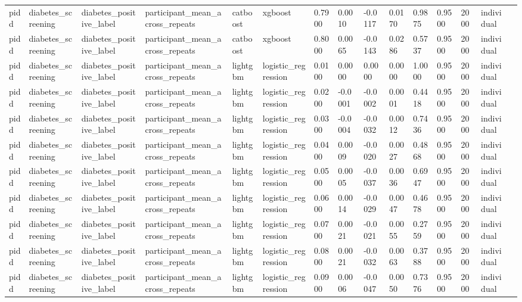 \begin{tabular}{lllllllllllllll}
pidd & diabetes\_screening & diabetes\_positive\_label & participant\_mean\_across\_repeats & catboost & xgboost & 0.7900 & 0.0010 & -0.0117 & 0.0170 & 0.9875 & 0.9500 & 2000 & individual &  \\
pidd & diabetes\_screening & diabetes\_positive\_label & participant\_mean\_across\_repeats & catboost & xgboost & 0.8000 & 0.0065 & -0.0143 & 0.0286 & 0.5737 & 0.9500 & 2000 & individual &  \\
pidd & diabetes\_screening & diabetes\_positive\_label & participant\_mean\_across\_repeats & lightgbm & logistic\_regression & 0.0100 & 0.0000 & 0.0000 & 0.0000 & 1.0000 & 0.9500 & 2000 & individual &  \\
pidd & diabetes\_screening & diabetes\_positive\_label & participant\_mean\_across\_repeats & lightgbm & logistic\_regression & 0.0200 & -0.0001 & -0.0002 & 0.0001 & 0.4418 & 0.9500 & 2000 & individual &  \\
pidd & diabetes\_screening & diabetes\_positive\_label & participant\_mean\_across\_repeats & lightgbm & logistic\_regression & 0.0300 & -0.0004 & -0.0032 & 0.0012 & 0.7436 & 0.9500 & 2000 & individual &  \\
pidd & diabetes\_screening & diabetes\_positive\_label & participant\_mean\_across\_repeats & lightgbm & logistic\_regression & 0.0400 & 0.0009 & -0.0020 & 0.0027 & 0.4868 & 0.9500 & 2000 & individual &  \\
pidd & diabetes\_screening & diabetes\_positive\_label & participant\_mean\_across\_repeats & lightgbm & logistic\_regression & 0.0500 & 0.0005 & -0.0037 & 0.0036 & 0.6947 & 0.9500 & 2000 & individual &  \\
pidd & diabetes\_screening & diabetes\_positive\_label & participant\_mean\_across\_repeats & lightgbm & logistic\_regression & 0.0600 & 0.0014 & -0.0029 & 0.0047 & 0.4678 & 0.9500 & 2000 & individual &  \\
pidd & diabetes\_screening & diabetes\_positive\_label & participant\_mean\_across\_repeats & lightgbm & logistic\_regression & 0.0700 & 0.0021 & -0.0021 & 0.0055 & 0.2759 & 0.9500 & 2000 & individual &  \\
pidd & diabetes\_screening & diabetes\_positive\_label & participant\_mean\_across\_repeats & lightgbm & logistic\_regression & 0.0800 & 0.0021 & -0.0032 & 0.0063 & 0.3788 & 0.9500 & 2000 & individual &  \\
pidd & diabetes\_screening & diabetes\_positive\_label & participant\_mean\_across\_repeats & lightgbm & logistic\_regression & 0.0900 & 0.0006 & -0.0047 & 0.0050 & 0.7376 & 0.9500 & 2000 & individual &  \\

\end{tabular}
